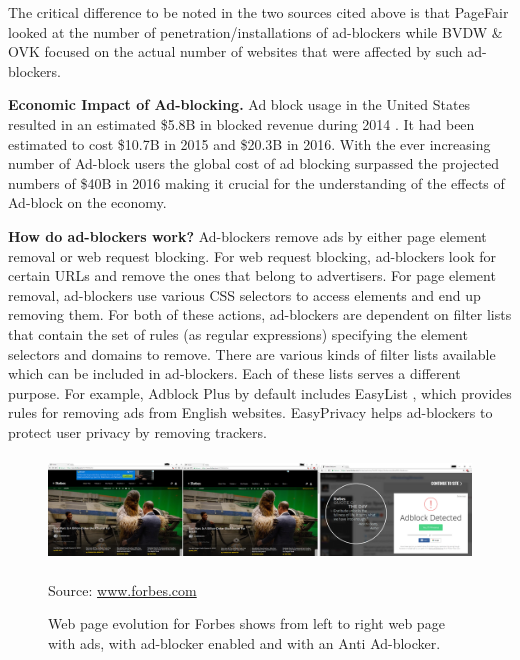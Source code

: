 \documentclass[runningheads,a4paper]{llncs}
\begin{document}
The critical difference to be noted in the two sources cited above is that PageFair looked at the number of penetration/installations of ad-blockers while BVDW \& OVK focused on the actual number of websites that were affected by such ad-blockers.

\textbf{Economic Impact of Ad-blocking.} Ad block usage in the United States resulted in an estimated \$5.8B in blocked revenue during 2014 \cite{costBlock}. It had been estimated to cost \$10.7B in 2015 and \$20.3B in 2016. With the ever increasing number of Ad-block users the global cost of ad blocking surpassed the projected numbers of \$40B in 2016 making it crucial for the understanding of the effects of Ad-block on the economy.

\textbf{How do ad-blockers work?} Ad-blockers remove
ads by either page element removal or web request blocking. For web request blocking, ad-blockers look for certain URLs and remove the ones that belong to advertisers. For page element removal, ad-blockers use various CSS selectors to access elements and end up removing them. For both of these actions, ad-blockers are dependent on filter lists that contain the set of rules (as regular expressions) specifying the element selectors and domains to remove. There are various kinds of filter lists available which can be included in ad-blockers. Each of these lists serves a different purpose. For example, Adblock Plus by default includes EasyList \cite{easyList}, which provides rules for removing ads from English websites. EasyPrivacy \cite{easyPrivacy} helps ad-blockers to protect user privacy by removing trackers.

\begin{figure}
\centering
\includegraphics[height=2.8cm]{forbes}
\caption{Web page evolution for Forbes shows from left to right web page with ads, with ad-blocker enabled and with an Anti Ad-blocker.}
Source: \url{www.forbes.com}
\label{fig:forbes}
\end{figure}
\end{document}
